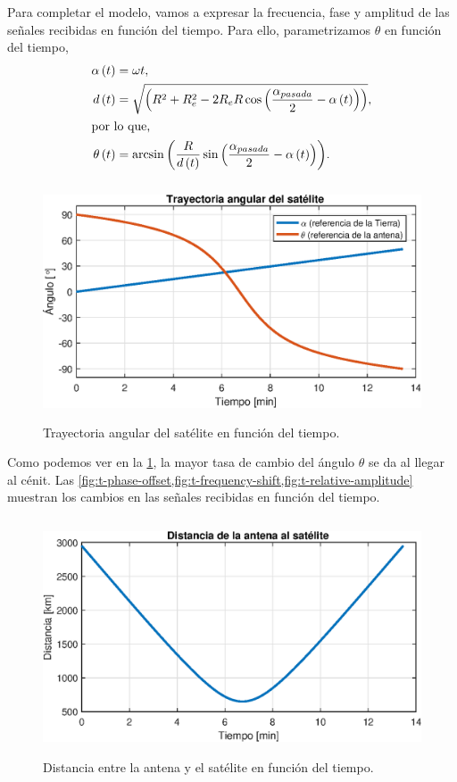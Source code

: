 \documentclass{article}
\newenvironment{standalone}{\begin{preview}}{\end{preview}}
\begin{document}
\begin{standalone}
  Para completar el modelo, vamos a expresar la frecuencia, fase y amplitud de las señales recibidas en función del tiempo.
  Para ello, parametrizamos $\theta$ en función del tiempo,
  \begin{align}
    \alpha \left( t \right) &= \omega t, \\
    d \left( t \right) &= \sqrt{ \left( R^2 + R_e^2 - 2 R_e R \cos{ \left( \frac{\alpha_{pasada}}{2} - \alpha \left( t \right) \right) } \right) }, \\
    \intertext{por lo que,}
    \theta \left( t \right) &= \arcsin{ \left( \frac{R}{d \left( t \right) } \sin{ \left( \frac{\alpha_{pasada}}{2} - \alpha \left( t \right) \right) } \right) }.
  \end{align}

  \begin{figure}[!htbp]
    \centering
    \includegraphics[width=\linewidth, height=70mm, keepaspectratio]{../images/angular-trajectory-satellite.eps}
    \caption{Trayectoria angular del satélite en función del tiempo.}
    \label{fig:angular-trajectory-satellite}
  \end{figure}

  Como podemos ver en la \cref{fig:angular-trajectory-satellite}, la mayor tasa de cambio del ángulo $\theta$ se da al llegar al cénit.
  Las \cref{fig:t-phase-offset,fig:t-frequency-shift,fig:t-relative-amplitude} muestran los cambios en las señales recibidas en función del tiempo.

  \begin{figure}[!htbp]
    \centering
    \includegraphics[width=\linewidth, height=70mm, keepaspectratio]{../images/t-distance-antenna-satellite.eps}
    \caption{Distancia entre la antena y el satélite en función del tiempo.}
    \label{fig:t-distance-antenna-satellite}
  \end{figure}


\end{standalone}
\end{document}
